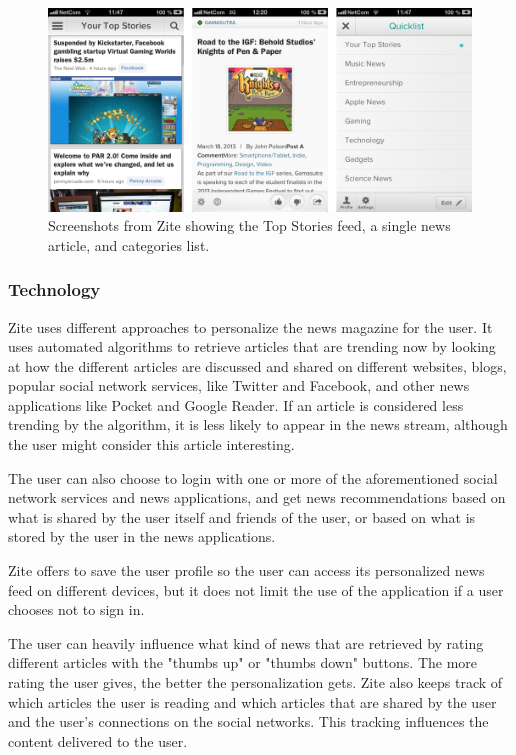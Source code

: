 \begin{figure}[!htbp]
\centering
\includegraphics[width=130mm]{GFX/screenshots/zite.png}
\caption{Screenshots from Zite showing the Top Stories feed, a single news article, and categories list.}
\label{screenshots_zite}
\end{figure}

\subsubsection{Technology}
Zite uses different approaches to personalize the news magazine for the user\cite{zite_faq}. It uses automated algorithms to retrieve articles that are trending now by looking at how the different articles are discussed and shared on different websites, blogs, popular social network services, like Twitter and Facebook, and other news applications like Pocket and Google Reader. If an article is considered less trending by the algorithm, it is less likely to appear in the news stream, although the user might consider this article interesting.

The user can also choose to login with one or more of the aforementioned social network services and news applications, and get news recommendations based on what is shared by the user itself and friends of the user, or based on what is stored by the user in the news applications. 

Zite offers to save the user profile so the user can access its personalized news feed on different devices, but it does not limit the use of the application if a user chooses not to sign in.

The user can heavily influence what kind of news that are retrieved by rating different articles with the "thumbs up" or "thumbs down" buttons. The more rating the user gives, the better the personalization gets. Zite also keeps track of which articles the user is reading and which articles that are shared by the user and the user's connections on the social networks. This tracking influences the content delivered to the user.

